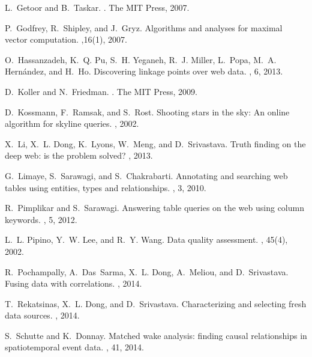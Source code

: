 \documentclass{sig-alternate}
\begin{document}
{\begin{thebibliography}{10}
L.~Getoor and B.~Taskar.
.
\newblock The MIT Press, 2007.

P.~Godfrey, R.~Shipley, and J.~Gryz.
\newblock Algorithms and analyses for maximal vector computation.
,16(1), 2007.

O.~Hassanzadeh, K.~Q. Pu, S.~H. Yeganeh, R.~J. Miller, L.~Popa, M.~A.
  Hern{\'a}ndez, and H.~Ho.
\newblock Discovering linkage points over web data.
, 6, 2013.


D.~Koller and N.~Friedman.
.
\newblock The MIT Press, 2009.

D.~Kossmann, F.~Ramsak, and S.~Rost.
\newblock Shooting stars in the sky: An online algorithm for skyline queries.
, 2002.

X.~Li, X.~L. Dong, K.~Lyons, W.~Meng, and D.~Srivastava.
\newblock Truth finding on the deep web: is the problem solved?
, 2013.

G.~Limaye, S.~Sarawagi, and S.~Chakrabarti.
\newblock Annotating and searching web tables using entities, types and
  relationships.
, 3, 2010.

R.~Pimplikar and S.~Sarawagi.
\newblock Answering table queries on the web using column keywords.
, 5, 2012.

L.~L. Pipino, Y.~W. Lee, and R.~Y. Wang.
\newblock Data quality assessment.
, 45(4), 2002.

R.~Pochampally, A.~Das~Sarma, X.~L. Dong, A.~Meliou, and D.~Srivastava.
\newblock Fusing data with correlations.
, 2014.

T.~Rekatsinas, X.~L. Dong, and D.~Srivastava.
\newblock Characterizing and selecting fresh data sources.
, 2014.

S.~Schutte and K.~Donnay.
\newblock Matched wake analysis: finding causal relationships in spatiotemporal
  event data.
, 41, 2014.


\end{thebibliography}}
\end{document}
